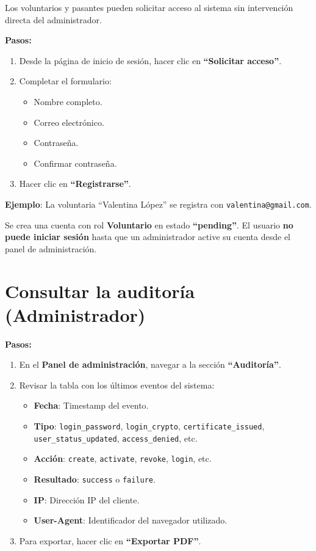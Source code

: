 \documentclass[10pt,letterpaper]{report}
\begin{document}
Los voluntarios y pasantes pueden solicitar acceso al sistema sin intervención directa del administrador.

\textbf{Pasos:}
\begin{enumerate}[leftmargin=2cm]
  \item Desde la página de inicio de sesión, hacer clic en \textbf{``Solicitar acceso''}.
  \item Completar el formulario:
  \begin{itemize}
    \item Nombre completo.
    \item Correo electrónico.
    \item Contraseña.
    \item Confirmar contraseña.
  \end{itemize}
  \item Hacer clic en \textbf{``Registrarse''}.
\end{enumerate}

\textbf{Ejemplo}: La voluntaria ``Valentina López'' se registra con \texttt{valentina@gmail.com}.

\begin{successbox}
  Se crea una cuenta con rol \textbf{Voluntario} en estado \textbf{``pending''}. El usuario \textbf{no puede iniciar sesión} hasta que un administrador active su cuenta desde el panel de administración.
\end{successbox}

\section{Consultar la auditoría (Administrador)}

\textbf{Pasos:}
\begin{enumerate}[leftmargin=2cm]
  \item En el \textbf{Panel de administración}, navegar a la sección \textbf{``Auditoría''}.
  \item Revisar la tabla con los últimos eventos del sistema:
  \begin{itemize}
    \item \textbf{Fecha}: Timestamp del evento.
    \item \textbf{Tipo}: \texttt{login\_password}, \texttt{login\_crypto}, \texttt{certificate\_issued}, \texttt{user\_status\_updated}, \texttt{access\_denied}, etc.
    \item \textbf{Acción}: \texttt{create}, \texttt{activate}, \texttt{revoke}, \texttt{login}, etc.
    \item \textbf{Resultado}: \texttt{success} o \texttt{failure}.
    \item \textbf{IP}: Dirección IP del cliente.
    \item \textbf{User-Agent}: Identificador del navegador utilizado.
  \end{itemize}
  \item Para exportar, hacer clic en \textbf{``Exportar PDF''}.
\end{enumerate}
\end{document}
